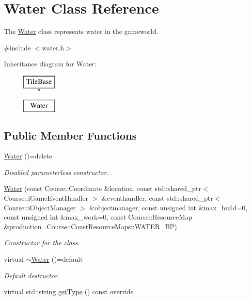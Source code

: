 \hypertarget{classWater}{\section{Water Class Reference}
\label{classWater}
}


The \hyperlink{classWater}{Water} class represents water in the gameworld.  




{\ttfamily \#include $<$water.\-h$>$}

Inheritance diagram for Water\-:\begin{figure}[H]
\begin{center}
\leavevmode
\includegraphics[height=2.000000cm]{classWater}
\end{center}
\end{figure}
\subsection*{Public Member Functions}
\begin{DoxyCompactItemize}
\item 
\hypertarget{classWater_a77f0e9aaeaaf84bdca5eec7cf284e935}{\hyperlink{classWater_a77f0e9aaeaaf84bdca5eec7cf284e935}{Water} ()=delete}\label{classWater_a77f0e9aaeaaf84bdca5eec7cf284e935}

\begin{DoxyCompactList}\small\item\em Disabled parameterless constructor. \end{DoxyCompactList}\item 
\hyperlink{classWater_a3dfea697acbcab2d5b7e673e1e986b8a}{Water} (const Course\-::\-Coordinate \&location, const std\-::shared\-\_\-ptr$<$ Course\-::i\-Game\-Event\-Handler $>$ \&eventhandler, const std\-::shared\-\_\-ptr$<$ Course\-::i\-Object\-Manager $>$ \&objectmanager, const unsigned int \&max\-\_\-build=0, const unsigned int \&max\-\_\-work=0, const Course\-::\-Resource\-Map \&production=Course\-::\-Const\-Resource\-Maps\-::\-W\-A\-T\-E\-R\-\_\-\-B\-P)
\begin{DoxyCompactList}\small\item\em Constructor for the class. \end{DoxyCompactList}\item 
\hypertarget{classWater_a87325a8a816059701379de0a788aa0b5}{virtual \hyperlink{classWater_a87325a8a816059701379de0a788aa0b5}{$\sim$\-Water} ()=default}\label{classWater_a87325a8a816059701379de0a788aa0b5}

\begin{DoxyCompactList}\small\item\em Default destructor. \end{DoxyCompactList}\item 
virtual std\-::string \hyperlink{classWater_a8da400015bc1da762833011c9bf76593}{get\-Type} () const override
\end{DoxyCompactItemize}


